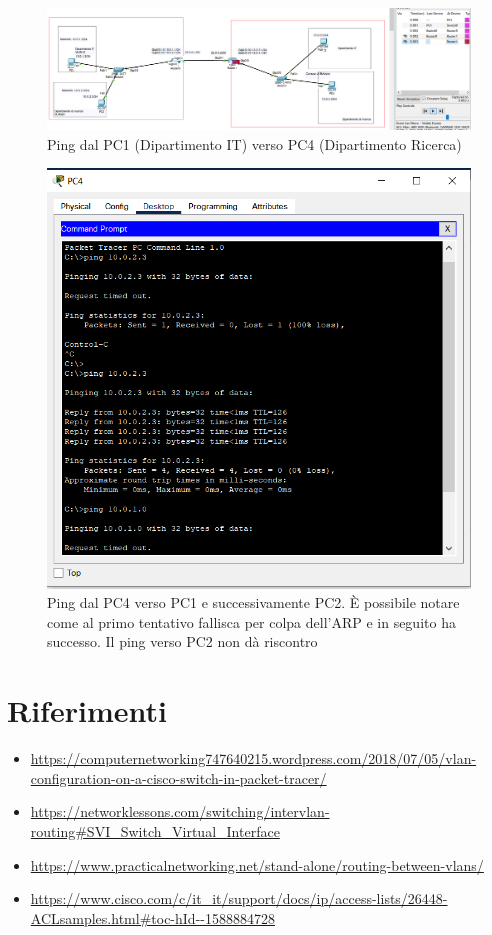 \documentclass[a4paper,12pt]{report}
\begin{document}
\begin{figure}[H]
\includegraphics[width=\textheight, angle=-90,origin=c]{pc1_pc4_ping_fail.png}
\caption{Ping dal PC1 (Dipartimento IT) verso PC4 (Dipartimento Ricerca)}
\label{fig:pc1_pc4_ping_fail}
\end{figure}
\begin{figure}[H]
\includegraphics{pc4_ping.png}
\caption{Ping dal PC4 verso PC1 e successivamente PC2. È possibile notare come al primo tentativo fallisca per colpa dell'ARP e in seguito ha successo. Il ping verso PC2 non dà riscontro}
\label{fig:pc4_ping}
\end{figure}
\chapter{Riferimenti}
\begin{itemize}
    \item \url{https://computernetworking747640215.wordpress.com/2018/07/05/vlan-configuration-on-a-cisco-switch-in-packet-tracer/}
    \item \url{https://networklessons.com/switching/intervlan-routing#SVI_Switch_Virtual_Interface}
    \item \url{https://www.practicalnetworking.net/stand-alone/routing-between-vlans/}
    \item \url{https://www.cisco.com/c/it_it/support/docs/ip/access-lists/26448-ACLsamples.html#toc-hId--1588884728}
\end{itemize}
\end{document}

